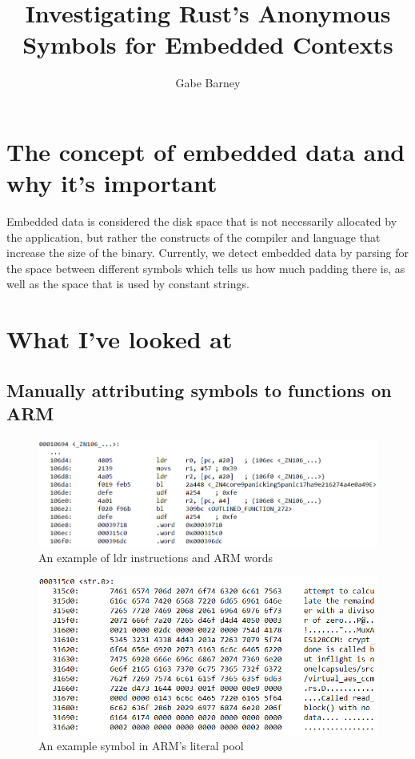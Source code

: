 \documentclass{article}
\title{Investigating Rust's Anonymous Symbols for Embedded Contexts}
\author{Gabe Barney}
\begin{document}
\maketitle

\section{The concept of embedded data and why it's important}

Embedded data is considered the disk space that is not necessarily allocated by the application, but rather the constructs of the compiler and language that increase the size of the binary. Currently, we detect embedded data by parsing for the space between different symbols which tells us how much padding there is, as well as the space that is used by constant strings.


\section{What I've looked at}

\subsection{Manually attributing symbols to functions on ARM}

\begin{figure}[h]
\centering
\includegraphics[width=.75\textwidth]{word_img.png}
\caption{\label{fig:word} An example of ldr instructions and ARM words}
\end{figure}
\begin{figure}[h]
\centering
\includegraphics[width=.7\textwidth]{str0_img.png}
\caption{\label{fig:str0}An example symbol in ARM's literal pool}
\end{figure}
\end{document}
